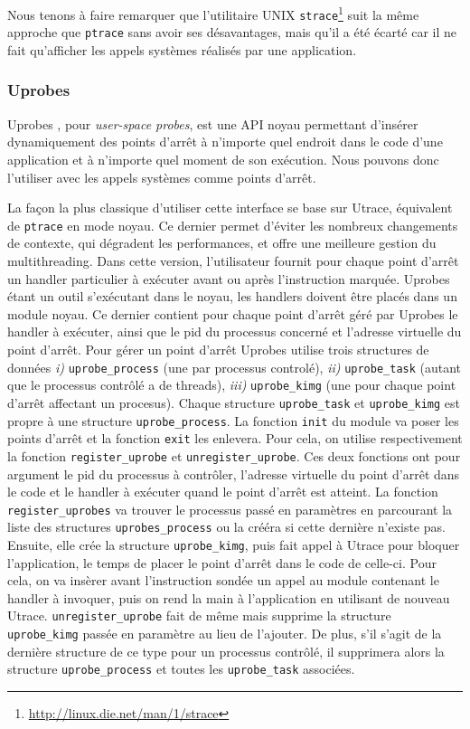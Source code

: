 Nous tenons à faire remarquer que l'utilitaire UNIX \texttt{strace}\footnote{\url{http://linux.die.net/man/1/strace}} suit la même approche que \texttt{ptrace} sans avoir ses désavantages, mais qu'il a été écarté car il ne fait qu'afficher les appels systèmes réalisés par une application.

\subsubsection{Uprobes}

Uprobes \citep{AS:Interception, MARION:Interception}, pour \textit{user-space
  probes}, est une API noyau permettant d'insérer dynamiquement des points
d'arrêt à n'importe quel endroit dans le code d'une application et à n'importe
quel moment de son exécution. Nous pouvons donc l'utiliser avec les appels
systèmes comme points d'arrêt.

La façon la plus classique d'utiliser cette interface se base sur Utrace,
équivalent de \texttt{ptrace} en mode noyau. Ce dernier permet d'éviter les
nombreux changements de contexte, qui dégradent les performances, et offre une
meilleure gestion du multithreading. Dans cette version, l'utilisateur fournit
pour chaque point d'arrêt un handler particulier à exécuter avant ou après
l’instruction marquée. Uprobes étant un outil s'exécutant dans le noyau, les
handlers doivent être placés dans un module noyau. Ce dernier contient pour
chaque point d'arrêt géré par Uprobes le handler à exécuter, ainsi que le pid du
processus concerné et l'adresse virtuelle du point d'arrêt. Pour gérer un point
d'arrêt Uprobes utilise trois structures de
données \textit{i)} \texttt{uprobe\_process} (une par processus controlé),
\textit{ii)} \texttt{uprobe\_task} (autant que le processus contrôlé a de
threads), \textit{iii)} \texttt{uprobe\_kimg} (une pour chaque point d'arrêt
affectant un procesus). Chaque structure \texttt{uprobe\_task} et
\texttt{uprobe\_kimg} est propre à une structure \texttt{uprobe\_process}. La
fonction \texttt{init} du module va poser les points d'arrêt et la fonction
\texttt{exit} les enlevera. Pour cela, on utilise respectivement la fonction
\texttt{register\_uprobe} et \texttt{unregister\_uprobe}. Ces deux fonctions ont
pour argument le pid du processus à contrôler, l'adresse virtuelle du point
d'arrêt dans le code et le handler à exécuter quand le point d'arrêt est
atteint. La fonction \texttt{register\_uprobes} va trouver le processus passé en
paramètres en parcourant la liste des structures \texttt{uprobes\_process} ou la
crééra si cette dernière n'existe pas. Ensuite, elle crée la structure
\texttt{uprobe\_kimg}, puis fait appel à Utrace pour bloquer l'application, le
temps de placer le point d'arrêt dans le code de celle-ci. Pour cela, on va
insèrer avant l'instruction sondée un appel au module contenant le handler à
invoquer, puis on rend la main à l'application en utilisant de nouveau
Utrace. \texttt{unregister\_uprobe} fait de même mais supprime la structure
\texttt{uprobe\_kimg} passée en paramètre au lieu de l'ajouter. De plus, s'il
s'agit de la dernière structure de ce type pour un processus contrôlé, il
supprimera alors la structure \texttt{uprobe\_process} et toutes les
\texttt{uprobe\_task} associées.


